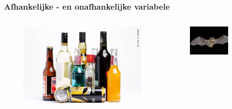 \documentclass{beamer}
\begin{document}
  \begin{frame}
    \frametitle{Afhankelijke - en onafhankelijke variabele}
    \begin{columns}
      \begin{column}{0.3\textwidth}

        \begin{figure}
          \centering
          \includegraphics[width=1.00\textwidth]{img/liquor.jpg}
          \label{fig:liquor}
        \end{figure}

      \end{column}
      \begin{column}{0.3\textwidth}

        \begin{figure}
          \centering
          \includegraphics[width=1.00\textwidth]{img/bat.jpg}
          \label{fig:bat}
        \end{figure}


\end{column}
\end{columns}
\end{frame}
\end{document}
